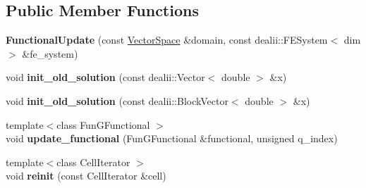 \subsection*{Public Member Functions}
\begin{DoxyCompactItemize}
\item 
\hypertarget{structSpacy_1_1dealII_1_1Detail_1_1FunctionalUpdate_ab821cbb044f46ced9517d1232ba7aba3}{{\bfseries Functional\-Update} (const \hyperlink{classSpacy_1_1VectorSpace}{Vector\-Space} \&domain, const dealii\-::\-F\-E\-System$<$ dim $>$ \&fe\-\_\-system)}\label{structSpacy_1_1dealII_1_1Detail_1_1FunctionalUpdate_ab821cbb044f46ced9517d1232ba7aba3}

\item 
\hypertarget{structSpacy_1_1dealII_1_1Detail_1_1FunctionalUpdate_a654de56746651a0980548dee8d43b8c1}{void {\bfseries init\-\_\-old\-\_\-solution} (const dealii\-::\-Vector$<$ double $>$ \&x)}\label{structSpacy_1_1dealII_1_1Detail_1_1FunctionalUpdate_a654de56746651a0980548dee8d43b8c1}

\item 
\hypertarget{structSpacy_1_1dealII_1_1Detail_1_1FunctionalUpdate_ad8023b49135e2c8429b40c898ec7e031}{void {\bfseries init\-\_\-old\-\_\-solution} (const dealii\-::\-Block\-Vector$<$ double $>$ \&x)}\label{structSpacy_1_1dealII_1_1Detail_1_1FunctionalUpdate_ad8023b49135e2c8429b40c898ec7e031}

\item 
\hypertarget{structSpacy_1_1dealII_1_1Detail_1_1FunctionalUpdate_ac5dc29b3e32d0af45014662ff0c68b02}{{\footnotesize template$<$class Fun\-G\-Functional $>$ }\\void {\bfseries update\-\_\-functional} (Fun\-G\-Functional \&functional, unsigned q\-\_\-index)}\label{structSpacy_1_1dealII_1_1Detail_1_1FunctionalUpdate_ac5dc29b3e32d0af45014662ff0c68b02}

\item 
\hypertarget{structSpacy_1_1dealII_1_1Detail_1_1FunctionalUpdate_a1cc737c45f26b22938974db684b32adc}{{\footnotesize template$<$class Cell\-Iterator $>$ }\\void {\bfseries reinit} (const Cell\-Iterator \&cell)}\label{structSpacy_1_1dealII_1_1Detail_1_1FunctionalUpdate_a1cc737c45f26b22938974db684b32adc}

\end{DoxyCompactItemize}
